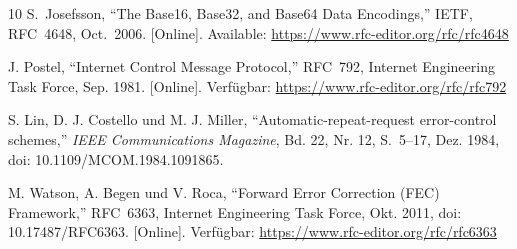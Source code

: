 \documentclass[11pt,a4paper]{article}
\begin{document}
\begin{thebibliography}{10}
S.~Josefsson, ``The Base16, Base32, and Base64 Data Encodings,''
IETF, RFC~4648, Oct.~2006. [Online].
Available: \url{https://www.rfc-editor.org/rfc/rfc4648}

J. Postel, ``Internet Control Message Protocol,'' RFC~792, Internet Engineering
Task Force, Sep. 1981. [Online]. Verfügbar:
\url{https://www.rfc-editor.org/rfc/rfc792}

S. Lin, D. J. Costello und M. J. Miller, ``Automatic-repeat-request
error-control schemes,'' \emph{IEEE Communications Magazine}, Bd. 22, Nr. 12,
S.~5--17, Dez. 1984, doi: 10.1109/MCOM.1984.1091865.

M. Watson, A. Begen und V. Roca, ``Forward Error Correction (FEC) Framework,''
RFC~6363, Internet Engineering Task Force, Okt. 2011, doi: 10.17487/RFC6363.
[Online]. Verfügbar: \url{https://www.rfc-editor.org/rfc/rfc6363}
 
\end{thebibliography}
\end{document}

